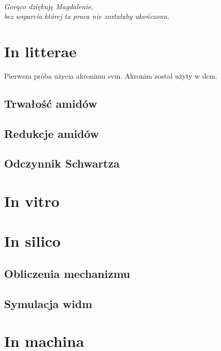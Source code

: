 \documentclass[a4paper, justified]{tufte-book}
\begin{document}
\frontmatter
\maketitle

\cleardoublepage
\thispagestyle{empty}
~\vfill
\vfill
\begin{fullwidth}
\begin{doublespace}
\raggedleft\noindent\fontsize{16}{20}\selectfont\itshape
\nohyphenation
Gorąco dziękuję Magdalenie,\\
bez wsparcia której ta praca nie zostałaby ukończona.
\end{doublespace}
\end{fullwidth}
\vfill

\tableofcontents



\mainmatter
\chapter{In litterae}
Pierwsza próba użycia akronimu \gls{svm}. Akronim został użyty w \gls{dcm}.
\section{Trwałość amidów}
\section{Redukcje amidów}
\section{Odczynnik Schwartza}

\chapter{In vitro}

\chapter{In silico}
\section{Obliczenia mechanizmu}
\section{Symulacja widm}

\chapter{In machina}
\end{document}
